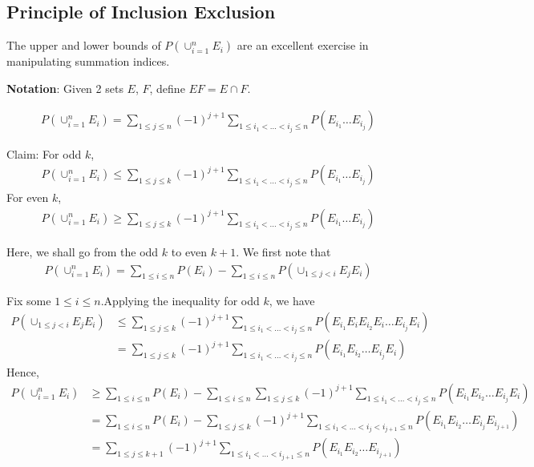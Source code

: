 \documentclass{article}
\begin{document}
\subsection{Principle of Inclusion Exclusion}
The upper and lower bounds of $P(\cup_{i=1}^n E_i)$ are an excellent exercise in manipulating summation indices.

\textbf{Notation}: Given 2 sets $E$, $F$, define $EF=E\cap F$.

\begin{align*}
	P(\cup_{i=1}^n E_i) = \sum_{1\leq j\leq n}(-1)^{j+1}\sum_{1\leq i_1 < \dots < i_j \leq n}P(E_{i_1}\dots E_{i_j})
\end{align*}

Claim:
For odd $k$,
\begin{align*}
	P(\cup_{i=1}^n E_i) \leq \sum_{1\leq j\leq k}(-1)^{j+1}\sum_{1\leq i_1 < \dots < i_j \leq n}P(E_{i_1}\dots E_{i_j})
\end{align*}
For even $k$,
\begin{align*}
	P(\cup_{i=1}^n E_i) \geq \sum_{1\leq j\leq k}(-1)^{j+1}\sum_{1\leq i_1 < \dots < i_j \leq n}P(E_{i_1}\dots E_{i_j})
\end{align*}

Here, we shall go from the odd $k$ to even $k+1$.
We first note that 
\begin{align*}
	P(\cup_{i=1}^n E_i) = \sum_{1\leq i\leq n}P(E_i) - \sum_{1\leq i\leq n}P(\cup_{1\leq j < i}E_jE_i)
\end{align*} 

Fix some $1\leq i\leq n$.Applying the inequality for odd $k$, we have
\begin{align*}
	P(\cup_{1\leq j < i}E_jE_i) &\leq \sum_{1\leq j\leq k}(-1)^{j+1}\sum_{1\leq i_1 < \dots < i_j \leq n} P(E_{i_1}E_iE_{i_2}E_i\dots E_{i_j}E_i)\\
	&= \sum_{1\leq j\leq k}(-1)^{j+1}\sum_{1\leq i_1 < \dots < i_j \leq n} P(E_{i_1}E_{i_2}\dots E_{i_j}E_i)
\end{align*}
Hence,
\begin{align*}
	P(\cup_{i=1}^n E_i) &\geq \sum_{1\leq i\leq n}P(E_i) - \sum_{1\leq i\leq n}\sum_{1\leq j\leq k}(-1)^{j+1}\sum_{1\leq i_1 < \dots < i_j \leq n} P(E_{i_1}E_{i_2}\dots E_{i_j}E_i)\\
	&= \sum_{1\leq i\leq n}P(E_i) - \sum_{1\leq j\leq k}(-1)^{j+1}\sum_{1\leq i_1 < \dots < i_j < i_{j+1} \leq n} P(E_{i_1}E_{i_2}\dots E_{i_j}E_{i_{j+1}})\\
	&= \sum_{1\leq j\leq k+1}(-1)^{j+1}\sum_{1\leq i_1 < \dots < i_{j+1} \leq n} P(E_{i_1}E_{i_2}\dots E_{i_{j+1}})
\end{align*} 
\end{document}
